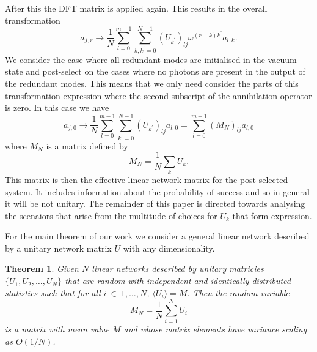 \documentclass[aps,pra,twocolumn,superscriptaddress,numerical,floatfix]{revtex4-1}
\newtheorem{theorem}{Theorem}
\begin{document}
After this the DFT matrix is applied again.  This results in the overall transformation
\begin{equation}
	a_{j,r} \rightarrow \frac{1}{N} 
	\sum_{l=0}^{m-1} \sum_{k,k^\prime=0}^{N-1}
	(U_{k^\prime})_{lj} \omega^{(r+k)k^\prime} a_{l,k}.
\end{equation}
We consider the case where all redundant modes are initialised in the vacuum state and post-select on the cases where no photons are present in the output of the redundant modes.  This means that we only need consider the parts of this transformation expression where the second subscript of the annihilation operator is zero.  In this case we have
\begin{equation}
	\label{sum_transformation}
	a_{j,0} \rightarrow \frac{1}{N}\sum_{l=0}^{m-1} \sum_{k^\prime=0}^{N-1}
	(U_{k^\prime})_{lj} a_{l,0} = \sum_{l=0}^{m-1} (M_N)_{lj} a_{l,0}
\end{equation}
where $M_N$ is a matrix defined by
\begin{equation}
	M_N = \frac{1}{N} \sum_k U_k.
\end{equation}
This matrix is then the effective linear network matrix for the post-selected system.  It includes information about the probability of success and so in general it will be not unitary.  The remainder of this paper is directed towards analysing the scenaiors that arise from the multitude of choices for $U_k$ that form expression.

For the main theorem of our work we consider a general linear network described by a unitary network matrix $U$ with any dimensionality. 


\begin{theorem}
\label{Theorem 1}
Given $N$ linear networks described by unitary matricies $\{U_1,U_2,\ldots,U_N\}$ that are random with independent and identically distributed statistics such that for all $i~\in~{1,\ldots,N}$, $\langle U_i \rangle = M$.  Then the random variable 
\begin{equation}
	\label{sum_unitary}
	M_{N}=\frac{1}{N}\sum_{i=1}^{N}U_{i}
\end{equation}
is a matrix with mean value $M$ and whose matrix elements have variance scaling as $O(1/N)$.
\end{theorem}
\end{document}
